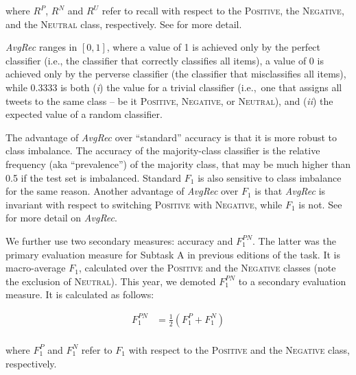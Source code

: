 \documentclass[11pt,a4paper]{article}
\begin{document}
\noindent where $R^{P}$, $R^{N}$ and $R^{U}$ refer to recall with respect to the \textsc{Positive}, the \textsc{Negative}, and the \textsc{Neutral} class, respectively.
See \cite{nakov-EtAl:2016:SemEval1} for more detail.

\emph{AvgRec} ranges in $[0,1]$, where a value of 1 is achieved only by the perfect
classifier (i.e., the classifier that correctly classifies all items), a value of 0 is achieved only by the perverse classifier (the classifier that
misclassifies all items), while $0.3333$ is both (\emph{i}) the value for a trivial classifier (i.e.,~one that assigns all tweets
to the same class -- be it \textsc{Positive}, \textsc{Negative}, or \textsc{Neutral}),
and (\emph{ii}) the expected value of a random classifier. 

The advantage of
\emph{AvgRec} over ``standard'' accuracy is that it is more robust to
class imbalance.  The accuracy of the
majority-class classifier is the relative frequency (aka
``prevalence'') of the majority class, that may be much higher than
0.5 if the test set is imbalanced.  Standard $F_{1}$ is also sensitive
to class imbalance for the same reason. Another advantage of
\emph{AvgRec} over $F_{1}$ is that \emph{AvgRec} is invariant with respect
to switching \textsc{Positive} with \textsc{Negative}, while $F_{1}$
is not.  See \cite{Sebastiani:2015zl} for more detail on \emph{AvgRec}.

We further use two secondary measures: accuracy and $F_{1}^{PN}$.
The latter was the primary evaluation measure for Subtask A in previous editions of the task. It is macro-average $F_1$, calculated over the \textsc{Positive} and the \textsc{Negative} classes (note the exclusion of \textsc{Neutral}).
This year, we demoted $F_{1}^{PN}$ to a secondary evaluation measure. It is calculated as follows:

\begin{equation}
  \begin{aligned}
 	  \label{eq:F1}
   F_1^{PN} & = \frac{1}{2}(F_1^{P}+F_1^{N}) \\
  \end{aligned}
\end{equation}

\noindent where $F_1^{P}$ and $F_1^{N}$ refer to $F_1$ with respect to the \textsc{Positive} and the \textsc{Negative} class, respectively.


\end{document}
